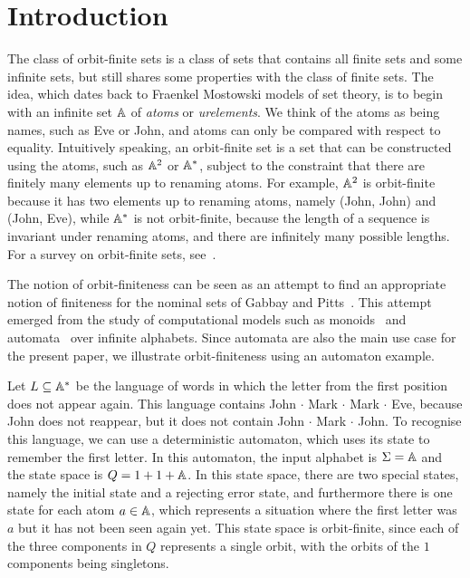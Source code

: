 \section{Introduction}
The class of orbit-finite sets is a class of sets that contains all finite sets and some infinite sets, but still shares some properties with the class of finite sets.  The idea, which dates back to Fraenkel Mostowski models of set theory,  is to begin with an infinite set $\mathbb A$ of \emph{atoms} or \emph{urelements}. We think of the atoms as being names, such as Eve or John, and atoms can only be compared with respect to equality. Intuitively speaking, an  orbit-finite set is a set  that can be constructed using the atoms, such as $\mathbb A^2$ or $\mathbb A^*$, subject to the constraint that there are finitely many elements up to  renaming atoms. For example, $\mathbb A^2$ is orbit-finite because it has two elements up to renaming atoms, namely (John, John) and (John, Eve), while $\mathbb A^*$ is not orbit-finite, because the length of a sequence is invariant under renaming atoms, and there are infinitely many possible lengths. For a survey on orbit-finite sets, see~\cite{bojanczyk_slightly2018}.

The notion of orbit-finiteness can be seen as an attempt to find an appropriate notion of finiteness for the  nominal sets of Gabbay and Pitts~\cite{PittsAM:nomsns}.  This attempt emerged from the study of computational models such as monoids~\cite{bojanczykNominalMonoids2013} and automata~\cite{bojanczykAutomataTheoryNominal2014} over infinite alphabets. Since automata are also the main use case for the present paper, we illustrate orbit-finiteness using an automaton example. 

\begin{example}\label{ex:first-letter-repeats}
    Let  $L \subseteq \mathbb A^*$ be the language of  words in which the letter from the first position does not appear again. This language contains John $\cdot$ Mark $\cdot$ Mark $\cdot$ Eve, because John does not reappear, but it does not contain John $\cdot$ Mark $\cdot$ John. To recognise this language, we can use a deterministic automaton, which uses its state to remember the first letter. In this automaton, the input alphabet is $\Sigma = \mathbb A$ and  the state space is $Q = 1 + 1 + \mathbb A$. In this state space, there are two special states, namely the initial state and a rejecting error state, and furthermore there is one state for each atom $a \in \mathbb A$, which represents a situation where the first letter was $a$ but it has not been seen again yet. This state space is orbit-finite, since each of the three components in $Q$ represents a single orbit, with the orbits of the $1$ components being singletons.\exampleend
\end{example}

